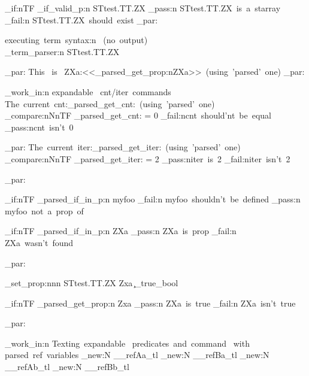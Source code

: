 \documentclass{article}
\begin{document}
\bool_if:nTF {\starray_if_valid_p:n {STtest.TT.ZX}}
  {\sttests_pass:n {STtest.TT.ZX~is~a~starray}}
  { \sttests_fail:n {STtest.TT.ZX~should~exist}}
\sttests_par:

executing~term~syntax:n ~(no~output)\\
\starray_term_parser:n {STtest.TT.ZX}

\sttests_par:
This~ is~ ZXa:<<\starray_parsed_get_prop:n{ZXa}>>~(using~'parsed'~one)
\sttests_par:

\sttests_work_in:n {expandable~ cnt/iter~commands}
The~current~cnt:\starray_parsed_get_cnt:~(using~'parsed'~one)\\

\int_compare:nNnTF {\starray_parsed_get_cnt:} = {0}
  {\sttests_fail:n{cnt~should'nt~be~equal}} 
  {\sttests_pass:n{cnt~isn't~0}}
  
\sttests_par:
The~current~iter:\starray_parsed_get_iter:~(using~'parsed'~one)\\


\int_compare:nNnTF {\starray_parsed_get_iter:} = {2}
  {\sttests_pass:n{iter~is~2}} 
  {\sttests_fail:n{iter~isn't~2}}



\sttests_par:

\bool_if:nTF { \starray_parsed_if_in_p:n {myfoo} }
  {  \sttests_fail:n {myfoo~shouldn't~be~defined } }
  {   \sttests_pass:n {myfoo~not~a~prop~of } }

\bool_if:nTF { \starray_parsed_if_in_p:n {ZXa} }
  {  \sttests_pass:n {ZXa~is~prop } }
  {   \sttests_fail:n {ZXa~wasn't~found } }





\sttests_par:


  
\starray_set_prop:nnn {STtest.TT.ZX}  {Zxa} {\c_true_bool}

\bool_if:nTF { \starray_parsed_get_prop:n {Zxa} }
  {  \sttests_pass:n {ZXa~is~true } }
  {   \sttests_fail:n {ZXa~isn't~true } }
  
  
  \sttests_par:
  
  
\sttests_work_in:n {Texting~expandable~ predicates~and~command~ with~ parsed~ref~variables}
\tl_new:N \__refAa_tl
\tl_new:N \__refBa_tl
\tl_new:N \__refAb_tl
\tl_new:N \__refBb_tl


\end{document}
